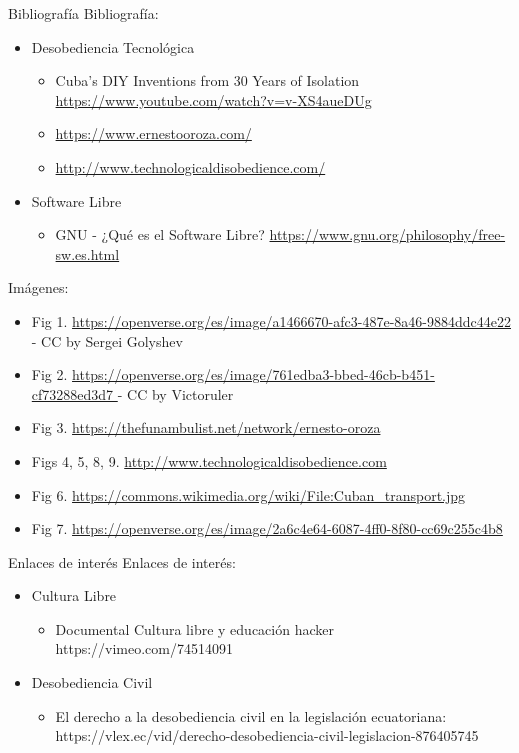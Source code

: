 \documentclass[spanish]{beamer}
\begin{document}
\begin{frame}{Bibliografía}
    Bibliografía:
    \begin{itemize}
        \item Desobediencia Tecnológica
        \begin{itemize}\footnotesize
            \item Cuba's DIY Inventions from 30 Years of Isolation \url{https://www.youtube.com/watch?v=v-XS4aueDUg}
            \item \url{https://www.ernestooroza.com/}
            \item \url{http://www.technologicaldisobedience.com/}
        \end{itemize}
        \item Software Libre
        \begin{itemize}\footnotesize
            \item GNU - ¿Qué es el Software Libre? \url{https://www.gnu.org/philosophy/free-sw.es.html}
        \end{itemize}
    \end{itemize}

    Imágenes:
    \begin{itemize}\tiny
        \item Fig 1. \url{https://openverse.org/es/image/a1466670-afc3-487e-8a46-9884ddc44e22 } - CC by Sergei Golyshev
        \item Fig 2. \url{https://openverse.org/es/image/761edba3-bbed-46cb-b451-cf73288ed3d7 } - CC by Victoruler
        \item Fig 3. \url{https://thefunambulist.net/network/ernesto-oroza}
        \item Figs 4, 5, 8, 9. \url{http://www.technologicaldisobedience.com}
        \item Fig 6. \url{https://commons.wikimedia.org/wiki/File:Cuban_transport.jpg}
        \item Fig 7. \url{https://openverse.org/es/image/2a6c4e64-6087-4ff0-8f80-cc69c255c4b8}
    \end{itemize}
\end{frame}

\begin{frame}{Enlaces de interés}
    Enlaces de interés:
    \begin{itemize}
        \item Cultura Libre
        \begin{itemize}
            \item Documental Cultura libre y educación hacker https://vimeo.com/74514091
        \end{itemize}
        \item Desobediencia Civil
        \begin{itemize}
            \item El derecho a la desobediencia civil en la legislación ecuatoriana:
            https://vlex.ec/vid/derecho-desobediencia-civil-legislacion-876405745
        \end{itemize}
    \end{itemize}
\end{frame}
\end{document}
